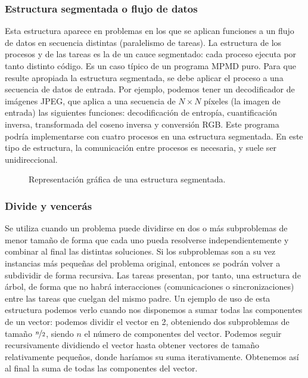 \subsubsection{Estructura segmentada o flujo de datos} 
Esta estructura aparece en problemas en los que se aplican funciones a un flujo de datos en secuencia distintas (paralelismo de tareas). La estructura de los procesos y de las tareas es la de un cauce segmentado: cada proceso ejecuta por tanto distinto código. Es un caso típico de un programa MPMD puro. Para que resulte apropiada la estructura segmentada, se debe aplicar el proceso a una secuencia de datos de entrada.
Por ejemplo, podemos tener un decodificador de imágenes JPEG, que aplica a una secuencia de $N\times N$ píxeles (la imagen de entrada) las siguientes funciones: decodificación de entropía, cuantificación inversa, transformada del coseno inversa y conversión RGB\@. Este programa podría implementarse con cuatro procesos en una estructura segmentada.
En este tipo de estructura, la comunicación entre procesos es necesaria, y suele ser unidireccional.
\begin{figure}[H]
\centering
{}
\caption{Representación gráfica de una estructura segmentada.}
\label{graph:estructura_segmentada}
\end{figure}

\subsubsection{Divide y vencerás} 
Se utiliza cuando un problema puede dividirse en dos o más subproblemas de menor tamaño de forma que cada uno pueda resolverse independientemente y combinar al final las distintas soluciones. Si los subproblemas son a su vez instancias más pequeñas del problema original, entonces se podrán volver a subdividir de forma recursiva. Las tareas presentan, por tanto, una estructura de árbol, de forma que no habrá interacciones (comunicaciones o sincronizaciones) entre las tareas que cuelgan del mismo padre.
Un ejemplo de uso de esta estructura podemos verlo cuando nos disponemos a sumar todas las componentes de un vector: podemos dividir el vector en 2, obteniendo dos subproblemas de tamaño $ \nicefrac{n}{2} $, siendo $n$ el número de componentes del vector. Podemos seguir recursivamente dividiendo el vector hasta obtener vectores de tamaño relativamente pequeños, donde haríamos su suma iterativamente. Obtenemos así al final la suma de todas las componentes del vector.

